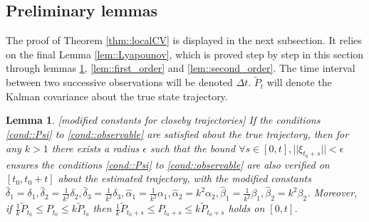 \documentclass[a4paper,12pt,onecolumn]{article}
\newtheorem{lem}{Lemma}
\begin{document}
\subsection{Preliminary lemmas}
The proof of Theorem \ref{thm::localCV} is displayed in the next subsection. It relies on the final Lemma \ref{lem::Lyapounov}, which is proved step by step in this section through lemmas \ref{lem::Riccati}, \ref{lem::first_order} and \ref{lem::second_order}. The time  interval between two successive observations will be denoted $\Delta t$. $\tilde P_t$ will denote the Kalman covariance about the true state trajectory.

\begin{lem}
\label{lem::Riccati} \emph{[modified constants for closeby trajectories]}
If the conditions \eqref{cond::Psi} to \eqref{cond::observable} are satisfied about the \emph{true} trajectory, then for any $k>1$ there exists a radius $\epsilon$ such that the bound $\forall s \in [0,t], || \xi_{t_0+s} || < \epsilon$ ensures the conditions \eqref{cond::Psi} to \eqref{cond::observable} are also verified on $[t_0,t_0+t]$ about the \emph{estimated} trajectory, with the modified constants $\hat{\delta}_1=\delta_1,\hat{\delta}_2=\frac{1}{k^2}\delta_2,\hat{\delta}_3=\frac{1}{k^2}\delta_3,\hat{\alpha}_1=\frac{1}{k^2}\alpha_1,\hat{\alpha}_2=k^2\alpha_2,\hat{\beta}_1= \frac{1}{k^2} \beta_1,\hat{\beta}_2=k^2 \beta_2$.  Moreover, if $\frac{1}{k} \tilde{P}_{t_0} \leq P_{t_0} \leq k \tilde{P}_{t_0}$ then $\frac{1}{k} \tilde{P}_{t_0+s} \leq P_{t_0+s} \leq k \tilde{P}_{t_0+s}$ holds on $[0,t]$.
\end{lem}
\end{document}
